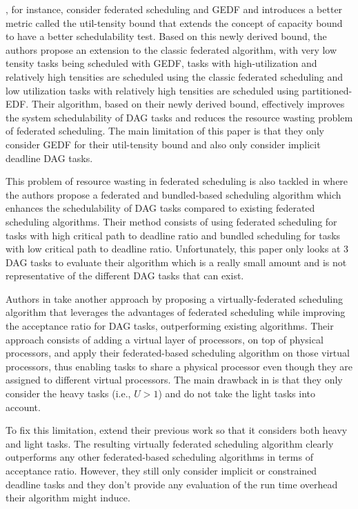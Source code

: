 \cite{jiangUtilTensityBound}, for instance, 
consider federated scheduling and GEDF
and introduces a better metric called the util-tensity bound
that extends the concept of capacity bound
to have a better schedulability test.
Based on this newly derived bound, the authors 
propose an extension to the classic federated algorithm,
with very low tensity tasks being scheduled with GEDF, 
tasks with high-utilization and relatively high tensities are scheduled
using the classic federated scheduling and low utilization
tasks with relatively high tensities are scheduled using partitioned-EDF.
Their algorithm, based on their newly derived bound, effectively improves
the system schedulability of DAG tasks and reduces the resource wasting 
problem of federated scheduling. The main limitation
of this paper is that they only consider GEDF 
for their util-tensity bound and also only consider implicit deadline DAG tasks.

This problem of resource wasting in federated scheduling
is also tackled in \cite{Kobayashi2023FedBundledDagsched}
where the authors propose a federated and bundled-based scheduling
algorithm which enhances the schedulability of DAG tasks
compared to existing federated scheduling algorithms.
Their method consists of using federated scheduling for
tasks with high critical path to deadline ratio and bundled
scheduling for tasks with low critical path to deadline ratio.
Unfortunately, this paper only looks at 3 DAG tasks to evaluate
their algorithm which is a really small amount and is not 
representative of the different DAG tasks that can exist.

Authors in \cite{JiangVirtuallyFederatedSched2021}
take another approach by proposing a virtually-federated 
scheduling algorithm that leverages the advantages
of federated scheduling while improving the acceptance 
ratio for DAG tasks, outperforming existing algorithms.
Their approach consists of adding a virtual layer
of processors, on top of physical processors,
and apply their federated-based scheduling algorithm on those virtual processors,
thus enabling tasks to share a physical processor
even though they are assigned to different virtual processors.
The main drawback in \cite{JiangVirtuallyFederatedSched2021}
is that they only consider the heavy tasks (i.e., $U > 1$)
and do not take the light tasks into account.

To fix this limitation, \cite{Jiang2023SchedVirtualProcs}
extend their previous work\cite{JiangVirtuallyFederatedSched2021}
so that it considers both heavy and light tasks.
The resulting virtually federated scheduling algorithm
clearly outperforms any other federated-based scheduling algorithms
in terms of acceptance ratio.
However, they still only consider implicit or constrained deadline tasks
and they don't provide any evaluation of the run time overhead 
their algorithm might induce.



